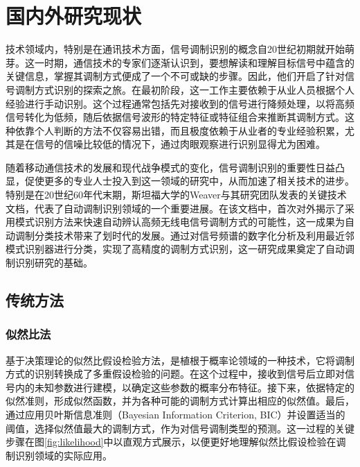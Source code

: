 \section{国内外研究现状}
技术领域内，特别是在通讯技术方面，信号调制识别的概念自20世纪初期就开始萌芽。这一时期，通信技术的专家们逐渐认识到，要想解读和理解目标信号中蕴含的关键信息，掌握其调制方式便成了一个不可或缺的步骤。因此，他们开启了针对信号调制方式识别的探索之旅。在最初阶段，这一工作主要依赖于从业人员根据个人经验进行手动识别。这个过程通常包括先对接收到的信号进行降频处理，以将高频信号转化为低频，随后依据信号波形的特定特征或特征组合来推断其调制方式。这种依靠个人判断的方法不仅容易出错，而且极度依赖于从业者的专业经验积累，尤其是在信号的信噪比较低的情况下，通过肉眼观察进行识别显得尤为困难。

随着移动通信技术的发展和现代战争模式的变化，信号调制识别的重要性日益凸显，促使更多的专业人士投入到这一领域的研究中，从而加速了相关技术的进步。特别是在20世纪60年代末期，斯坦福大学的Weaver与其研究团队发表的关键技术文档，代表了自动调制识别领域的一个重要进展。在该文档中，首次对外揭示了采用模式识别方法来快速自动辨认高频无线电信号调制方式的可能性，这一成果为自动调制分类技术带来了划时代的发展\cite{weaver1969automatic}。通过对信号频谱的数字化分析及利用最近邻模式识别器进行分类，实现了高精度的调制方式识别，这一研究成果奠定了自动调制识别研究的基础。

\subsection{传统方法}
\subsubsection{似然比法}

基于决策理论的似然比假设检验方法，是植根于概率论领域的一种技术，它将调制方式的识别转换成了多重假设检验的问题。在这个过程中，接收到信号后立即对信号内的未知参数进行建模，以确定这些参数的概率分布特征。接下来，依据特定的似然准则，形成似然函数，并为各种可能的调制方式计算出相应的似然值。最后，通过应用贝叶斯信息准则（Bayesian Information Criterion, BIC）并设置适当的阈值，选择似然值最大的调制方式，作为对信号调制类型的预测。这一过程的关键步骤在图\ref{fig:likelihood}中以直观方式展示，以便更好地理解似然比假设检验在调制识别领域的实际应用。

